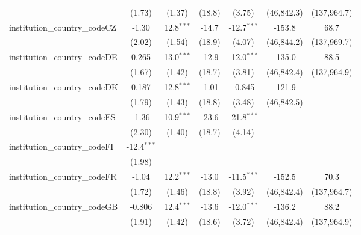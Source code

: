 \begin{tabular}{lcccccc}
                                         & (1.73)        & (1.37)        & (18.8)        & (3.75)        & (46,842.3)   & (137,964.7)\\   
   institution\_country\_codeCZ          & -1.30         & 12.8$^{***}$  & -14.7         & -12.7$^{***}$ & -153.8       & 68.7\\   
                                         & (2.02)        & (1.54)        & (18.9)        & (4.07)        & (46,844.2)   & (137,969.7)\\   
   institution\_country\_codeDE          & 0.265         & 13.0$^{***}$  & -12.9         & -12.0$^{***}$ & -135.0       & 88.5\\   
                                         & (1.67)        & (1.42)        & (18.7)        & (3.81)        & (46,842.4)   & (137,964.9)\\   
   institution\_country\_codeDK          & 0.187         & 12.8$^{***}$  & -1.01         & -0.845        & -121.9       &   \\   
                                         & (1.79)        & (1.43)        & (18.8)        & (3.48)        & (46,842.5)   &   \\   
   institution\_country\_codeES          & -1.36         & 10.9$^{***}$  & -23.6         & -21.8$^{***}$ &              &   \\   
                                         & (2.30)        & (1.40)        & (18.7)        & (4.14)        &              &   \\   
   institution\_country\_codeFI          & -12.4$^{***}$ &               &               &               &              &   \\   
                                         & (1.98)        &               &               &               &              &   \\   
   institution\_country\_codeFR          & -1.04         & 12.2$^{***}$  & -13.0         & -11.5$^{***}$ & -152.5       & 70.3\\   
                                         & (1.72)        & (1.46)        & (18.8)        & (3.92)        & (46,842.4)   & (137,964.7)\\   
   institution\_country\_codeGB          & -0.806        & 12.4$^{***}$  & -13.6         & -12.0$^{***}$ & -136.2       & 88.2\\   
                                         & (1.91)        & (1.42)        & (18.6)        & (3.72)        & (46,842.4)   & (137,964.9)\\   

\end{tabular}

